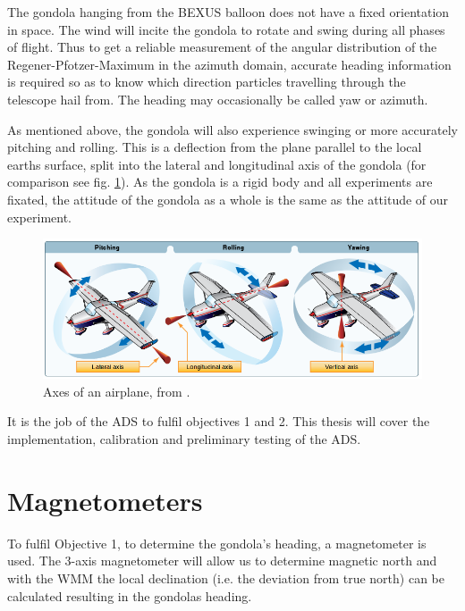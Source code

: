 The gondola hanging from the \ac{BEXUS} balloon does not have a fixed orientation in space. The wind will incite the gondola to rotate and swing during all phases of flight. Thus to get a reliable measurement of the angular distribution of the Regener-Pfotzer-Maximum in the azimuth domain, accurate heading information is required so as to know which direction particles travelling through the telescope hail from. The heading may occasionally be called yaw or azimuth.


As mentioned above, the gondola will also experience swinging or more accurately pitching and rolling. This is a deflection from the plane parallel to the local earths surface, split into the lateral and longitudinal axis of the gondola (for comparison see fig. \ref{fig:attitude}). As the gondola is a rigid body and all experiments are fixated, the attitude of the gondola as a whole is the same as the attitude of our experiment.


\begin{figure}[H]
    \centering
    \includegraphics[width=0.5\linewidth]{images/01_background/axes_of_an_airplane.png}
    \caption[Axes of an airplane]{Axes of an airplane, from \cite{pilot-handbook}.}
    \label{fig:attitude}
\end{figure}

It is the job of the \ac{ADS} to fulfil objectives 1 and 2. This thesis will cover the implementation, calibration and preliminary testing of the \ac{ADS}.

\section{Magnetometers \label{sec:bg:magnetometers}}
To fulfil Objective 1, to determine the gondola's heading, a magnetometer is used. The 3-axis magnetometer will allow us to determine magnetic north and with the \ac{WMM} the local declination (i.e. the deviation from true north) can be calculated resulting in the gondolas heading. 

